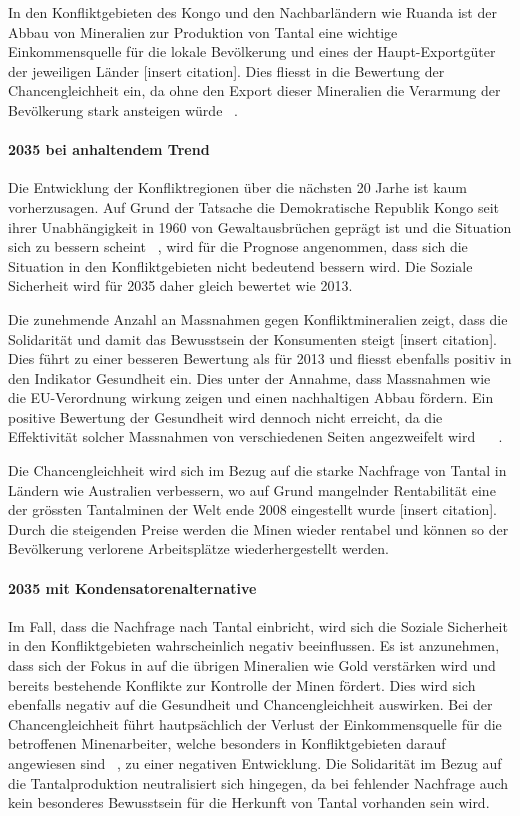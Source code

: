 In den Konfliktgebieten des Kongo und den Nachbarländern wie Ruanda ist der Abbau von 
Mineralien zur Produktion von Tantal eine wichtige Einkommensquelle für die lokale Bevölkerung
und eines der Haupt-Exportgüter der jeweiligen Länder [insert citation]. Dies fliesst in
die Bewertung der Chancengleichheit ein, da ohne den Export dieser Mineralien die Verarmung
der Bevölkerung stark ansteigen würde ~\cite{DRCongo35}.

\paragraph{2035 bei anhaltendem Trend} Die Entwicklung der Konfliktregionen über die nächsten 20 Jarhe
ist kaum vorherzusagen. Auf Grund der Tatsache die Demokratische Republik Kongo seit ihrer Unabhängigkeit
in 1960 von Gewaltausbrüchen geprägt ist und die Situation sich zu bessern scheint ~\cite{Demokrat2}, wird für die 
Prognose angenommen, dass sich die Situation in den Konfliktgebieten nicht bedeutend bessern wird.
Die Soziale Sicherheit wird für 2035 daher gleich bewertet wie 2013. 

Die zunehmende Anzahl an Massnahmen gegen Konfliktmineralien zeigt, dass die Solidarität und damit das Bewusstsein
der Konsumenten steigt [insert citation]. Dies führt zu einer besseren Bewertung als für 2013 und fliesst ebenfalls
positiv in den Indikator Gesundheit ein. Dies unter der Annahme, dass Massnahmen wie die EU-Verordnung wirkung zeigen und
einen nachhaltigen Abbau fördern. Ein positive Bewertung der Gesundheit wird dennoch nicht erreicht, da die Effektivität
solcher Massnahmen von verschiedenen Seiten angezweifelt wird ~\cite{Demokrat2} ~\cite{TheEUCon25}. 

Die Chancengleichheit wird sich im Bezug auf die starke Nachfrage von Tantal in Ländern wie
Australien verbessern, wo auf Grund mangelnder Rentabilität eine der grössten Tantalminen der Welt ende 2008 
eingestellt wurde [insert citation]. Durch die steigenden Preise werden die Minen wieder rentabel und 
können so der Bevölkerung verlorene Arbeitsplätze wiederhergestellt werden.  

\paragraph{2035 mit Kondensatorenalternative} Im Fall, dass die Nachfrage nach Tantal einbricht, wird sich die
Soziale Sicherheit in den Konfliktgebieten wahrscheinlich negativ beeinflussen. Es ist anzunehmen, dass sich der
Fokus in auf die übrigen Mineralien wie Gold verstärken wird und bereits bestehende Konflikte zur Kontrolle der 
Minen fördert. Dies wird sich ebenfalls negativ auf die Gesundheit und Chancengleichheit auswirken. Bei der 
Chancengleichheit führt hautpsächlich der Verlust der Einkommensquelle für die betroffenen Minenarbeiter, welche
besonders in Konfliktgebieten darauf angewiesen sind ~\cite{Obamasc19}, zu einer negativen Entwicklung. 
Die Solidarität im Bezug auf die Tantalproduktion neutralisiert sich hingegen, da bei fehlender Nachfrage auch 
kein besonderes Bewusstsein für die Herkunft von Tantal vorhanden sein wird.  


